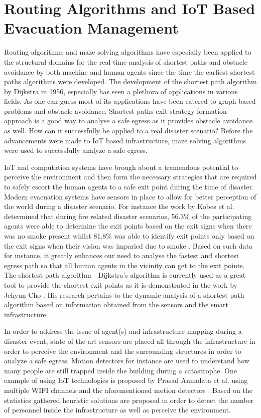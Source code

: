\section{Routing Algorithms and IoT Based Evacuation Management}
\label{sec:pastwork:Routing Algorithms and IoT Based Evacuation Management}

Routing algorithms and maze solving algorithms have especially been applied to the structural domains for the real time analysis of shortest paths and obstacle avoidance by both machine and human agents since the time the earliest shortest paths algorithms were developed. The development of the shortest path algorithm by Dijkstra in 1956, especially has seen a plethora of applications in various fields. As one can guess most of its applications have been catered to graph based problems and obstacle avoidance. Shortest paths exit strategy formation approach is a good way to analyse a safe egress as it provides obstacle avoidance as well. How can it successfully be applied to a real disaster scenario? Before the advancements were made to IoT based infrastructure, maze solving algorithms were used to successfully analyze a safe egress. 

IoT and computation systems have brough about a tremendous potential to perceive the environment and then form the necessary strategies that are required to safely escort the human agents to a safe exit point during the time of disaster. Modern evacuation systems have sensors in place to allow for better perception of the world during a disaster scenario. For instance the work by Kobes et al. determined that during fire related disaster scenarios, 56.3\% of the participating agents were able to determine the exit points based on the exit signs when there was no smoke present whilst 81.8\% was able to identify exit points only based on the exit signs when their vision was imparied due to smoke \cite{ref11}. Based on such data for instance, it greatly enhances our need to analyse the fastest and shortest egress path so that all human agents in the vicinity can get to the exit points. The shortest path algorithm - Dijkstra's algorithm is currently used as a great tool to provide the shortest exit points as it is demonstrated in the work by Jehyun Cho \cite{ref12}. His research pertains to the dynamic analysis of a shortest path algorithm based on information obtained from the sensors and the smart infrastructure.  

In order to address the issue of agent(s) and infrastructure mapping during a disaster event, state of the art sensors are placed all through the infrastructure in order to perceive the environment and the surrounding structures in order to analyze a safe egress. Motion detectors for instance are used to understand how many people are still trapped inside the building during a catastrophe. One example of using IoT technologies is proposed by Prasad Annadata et al. using multiple WIFI channels and the aforementioned motion detectors \cite{ref13}. Based on the statistics gathered heuristic solutions are proposed in order to detect the number of personnel inside the infrastructure as well as perceive the environment. 

